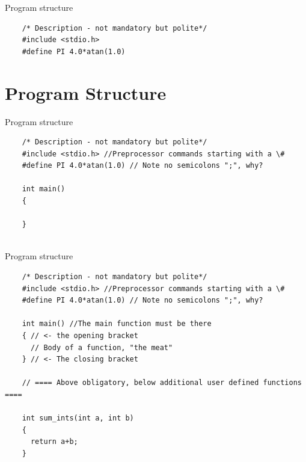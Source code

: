 \documentclass[10pt]{beamer}
\begin{document}
\begin{frame}[fragile]{Program structure}

    \begin{lstlisting}
    /* Description - not mandatory but polite*/
    #include <stdio.h>
    #define PI 4.0*atan(1.0)
    \end{lstlisting}
    \vspace{0.2cm}

\end{frame}

\section{Program Structure}

\begin{frame}[fragile]{Program structure}
    \begin{lstlisting}
    /* Description - not mandatory but polite*/
    #include <stdio.h> //Preprocessor commands starting with a \#
    #define PI 4.0*atan(1.0) // Note no semicolons ";", why?
       
    int main()
    {
     
    }
       
    \end{lstlisting}
 
\end{frame}

\begin{frame}[fragile]{Program structure}
    \begin{lstlisting}
    /* Description - not mandatory but polite*/
    #include <stdio.h> //Preprocessor commands starting with a \#
    #define PI 4.0*atan(1.0) // Note no semicolons ";", why?
     
    int main() //The main function must be there
    { // <- the opening bracket
      // Body of a function, "the meat"
    } // <- The closing bracket
   
    // ==== Above obligatory, below additional user defined functions ====
   
    int sum_ints(int a, int b)
    {
      return a+b;
    }    
    \end{lstlisting}
 
\end{frame}
\end{document}
